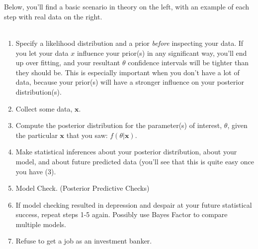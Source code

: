 \documentclass[12pt]{book}
\begin{document}
\\\\
Below, you'll find a basic scenario in theory on the left, with an example of each step with real data on the right.
\\\\
\twocolumn 
\begin{enumerate}
\item Specify a likelihood distribution and a prior \textit{before} inspecting your data. If you let your data $x$ influence your prior(s) in any significant way, you'll end up over fitting, and your resultant $\theta$ confidence intervals will be tighter than they should be. This is especially important when you don't have a lot of data, because your prior(s) will have a stronger influence on your posterior distribution(s).
\item Collect some data, $\textbf{x}$.
\item Compute the posterior distribution for the parameter(s) of interest, $\theta$, given the particular $\textbf{x}$ that you saw: $f(\theta|\textbf{x})$.
\item Make statistical inferences about your posterior distribution, about your model, and about future predicted data (you'll see that this is quite easy once you have (3).
\item Model Check. (Posterior Predictive Checks)
\item If model checking resulted in depression and despair at your future statistical success, repeat steps 1-5 again. Possibly use Bayes Factor to compare multiple models.
\item Refuse to get a job as an investment banker.
\end{enumerate}
{\color{blue}{
\begin{enumerate}
\item Example to comeeee.... yay a.
\item 
\item 
\item 
\item 
\item 
\end{enumerate}
}}
\newpage

\onecolumn
\end{document}
